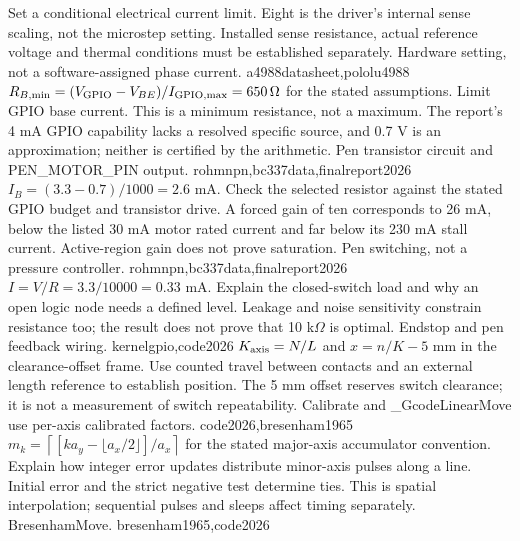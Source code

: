 {Set a conditional electrical current limit. Eight is the driver's internal
sense scaling, not the microstep setting. Installed sense resistance, actual
reference voltage and thermal conditions must be established separately.}
{Hardware setting, not a software-assigned phase current.}
{a4988datasheet,pololu4988}
{$R_{B,\min}=(V_{\rm GPIO}-V_{BE})/I_{\rm GPIO,max}=650\,\Omega$ for the stated assumptions.}
{Limit GPIO base current. This is a minimum resistance, not a maximum. The
report's 4 mA GPIO capability lacks a resolved specific source, and 0.7 V is
an approximation; neither is certified by the arithmetic.}
{Pen transistor circuit and PEN\_MOTOR\_PIN output.}
{rohmnpn,bc337data,finalreport2026}
{$I_B=(3.3-0.7)/1000=2.6$ mA.}
{Check the selected resistor against the stated GPIO budget and transistor
drive. A forced gain of ten corresponds to 26 mA, below the listed 30 mA
motor rated current and far below its 230 mA stall current. Active-region gain
does not prove saturation.}
{Pen switching, not a pressure controller.}
{rohmnpn,bc337data,finalreport2026}
{$I=V/R=3.3/10000=0.33$ mA.}
{Explain the closed-switch load and why an open logic node needs a defined
level. Leakage and noise sensitivity constrain resistance too; the result
does not prove that 10 k$\Omega$ is optimal.}
{Endstop and pen feedback wiring.}
{kernelgpio,code2026}
{$K_{\rm axis}=N/L$ and $x=n/K-5$ mm in the clearance-offset frame.}
{Use counted travel between contacts and an external length reference to
establish position. The 5 mm offset reserves switch clearance; it is not a
measurement of switch repeatability.}
{Calibrate and \_GcodeLinearMove use per-axis calibrated factors.}
{code2026,bresenham1965}
{$m_k=\left\lceil[k a_y-\lfloor a_x/2\rfloor]/a_x\right\rceil$ for the stated
major-axis accumulator convention.}
{Explain how integer error updates distribute minor-axis pulses along a line.
Initial error and the strict negative test determine ties. This is spatial
interpolation; sequential pulses and sleeps affect timing separately.}
{BresenhamMove.}
{bresenham1965,code2026}


